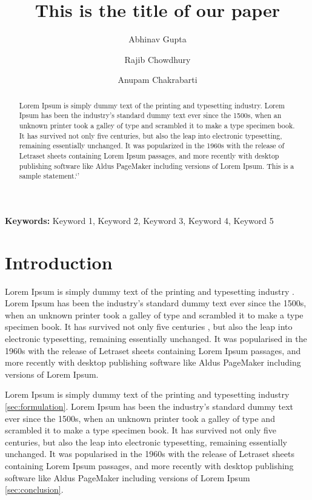 \documentclass[10pt,a4paper, oneside]{article}
\theoremstyle{remark}
\providecommand{\keywords}[1]{\textbf{{Keywords:}} #1}
\begin{document}
	\title{This is the title of our paper}
	\author[1]{Abhinav Gupta}
	\author[1]{Rajib Chowdhury}
	\author[1]{Anupam Chakrabarti}

	\thispagestyle{empty}
	\newpage

	\maketitle
	\setcounter{page}{1}

	\begin{abstract}
		Lorem Ipsum is simply dummy text of the printing and typesetting industry. Lorem Ipsum has been the industry's standard dummy text ever since the 1500s, when an unknown printer took a galley of type and scrambled it to make a type specimen book. It has survived not only five centuries, but also the leap into electronic typesetting, remaining essentially unchanged. It was popularized in the 1960s with the release of Letraset sheets containing Lorem Ipsum passages, and more recently with desktop publishing software like Aldus PageMaker including versions of Lorem Ipsum. This is a sample statement.`'
	\end{abstract}
	\keywords{Keyword 1, Keyword 2, Keyword 3, Keyword 4, Keyword 5}
	\section{Introduction}
	Lorem Ipsum is simply dummy text of the printing and typesetting industry \citet{gupta55lineCodeLargescale2020}. Lorem Ipsum has been the industry's standard dummy text ever since the 1500s, when an unknown printer took a galley of type and scrambled it to make a type specimen book. It has survived not only five centuries \citep{guptaAutoadaptiveSubsteppingAlgorithm2020a,mandalLengthScaleInsensitive2020a}, but also the leap into electronic typesetting, remaining essentially unchanged. It was popularised in the 1960s with the release of Letraset sheets containing Lorem Ipsum passages, and more recently with desktop publishing software like Aldus PageMaker including versions of Lorem Ipsum.

	Lorem Ipsum is simply dummy text of the printing and typesetting industry \cref{sec:formulation}. Lorem Ipsum  has been the industry's standard dummy text ever since the 1500s, when an unknown printer took a galley of type and scrambled it to make a type specimen book. It has survived not only five centuries, but also the leap into electronic typesetting, remaining essentially unchanged. It was popularised in the 1960s with the release of Letraset sheets containing Lorem Ipsum passages, and more recently with desktop publishing software like Aldus PageMaker including versions of Lorem Ipsum \cref{sec:conclusion}.
\end{document}
